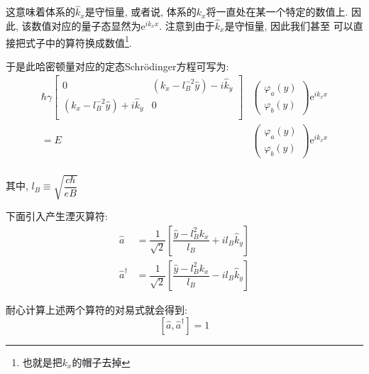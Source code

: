 \documentclass[a4paper, 11pt]{article}
\begin{document}
\begin{spacing}{1.2}
        这意味着体系的$\hat{k}_x$是守恒量, 或者说, 体系的$k_x$将一直处在某一个特定的数值上. 因此, 
        该数值对应的量子态显然为$\mathrm{e}^{ik_xx}$. 注意到由于$\hat{k}_x$是守恒量, 因此我们甚至
        可以直接把式子中的算符换成数值\footnote{也就是把$k_x$的帽子去掉}. 

        于是此哈密顿量对应的定态Schr\"odinger方程可写为:
        \begin{equation}
          \begin{aligned}
            \hbar\gamma
            \begin{bmatrix}
              0        & \left(k_x-l_B^{-2}\hat{y}\right)-i\hat{k}_y  \\
              \left(k_x-l_B^{-2}\hat{y}\right)+i\hat{k}_y & 0         \\
            \end{bmatrix}
            &\left(\begin{array}{c}
              \varphi_a(y)\\
              \varphi_b(y)
            \end{array}\right)
            \mathrm{e}^{ik_xx}\\ 
            = E&\left(\begin{array}{c}
              \varphi_a(y)\\
              \varphi_b(y)
            \end{array}\right)\mathrm{e}^{ik_xx} \\
          \end{aligned}
        \end{equation}
        
        其中, $l_B \equiv \sqrt{\dfrac{c\hbar}{eB}}$

        下面引入产生湮灭算符:
        \begin{subequations}
          \begin{align}
            \hat{a} &= \dfrac{1}{\sqrt{2}}\left[\dfrac{\hat{y}-l_B^2k_x}{l_B}+il_B\hat{k}_y\right]\\
            \hat{a}^{\dagger} &= \dfrac{1}{\sqrt{2}}\left[\dfrac{\hat{y}-l_B^2k_x}{l_B}-il_B\hat{k}_y\right]
          \end{align}
        \end{subequations}

        耐心计算上述两个算符的对易式就会得到:
        \begin{equation}
          \label{szjf:gjdys}
          \left[\hat{a}, \hat{a}^{\dagger}\right] = 1
        \end{equation}


\end{spacing}
\end{document}
